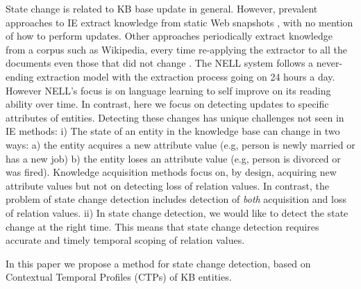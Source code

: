 \documentclass[11pt,a4paper]{article}
\renewcommand{\paragraph}[1]{\noindent\textbf{#1.}}
\begin{document}
State change is related to KB base update in general. However, prevalent approaches to IE extract knowledge from static Web snapshots \cite{Fader11,Nakashole11}, with no mention of how to perform updates. Other approaches periodically extract knowledge from a corpus such as Wikipedia, every time re-applying the extractor to all the documents even those that did not change \cite{Suchanek07}.  The NELL system \cite{Carlson10} follows a never-ending extraction model with the extraction process going on 24 hours a day. However NELL's focus is on language learning  to self improve on its reading ability over time.  In contrast, here we focus on  detecting  updates to specific attributes of entities.  Detecting these changes has unique   challenges not seen in IE methods: 
  i) The state of an entity in the knowledge base can change in two ways: a) the entity  acquires a new attribute value (e.g, person is newly  married or has a new job)
 b) the entity loses an attribute value (e.g, person is divorced or was fired). Knowledge acquisition methods focus on, by design,  acquiring  new attribute values but not on detecting loss of relation values.  In contrast, the problem of state change detection includes detection of \textit{both}
 acquisition and loss of relation values.
 ii)  In state change detection, we would like to detect the state change at the right time.
  This means that state change detection requires accurate and timely  temporal  scoping of  relation values.
  

In this paper we propose a method for state change detection, based on Contextual Temporal Profiles (CTPs)
of KB entities.
\end{document}
